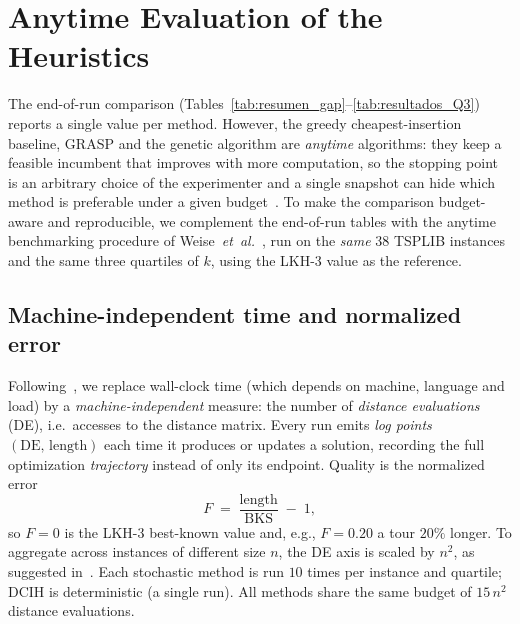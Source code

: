 
\section{Anytime Evaluation of the Heuristics}\label{sec:anytime}

The end-of-run comparison (Tables~\ref{tab:resumen_gap}--\ref{tab:resultados_Q3})
reports a single value per method. However, the greedy cheapest-insertion
baseline, GRASP and the genetic algorithm are \emph{anytime} algorithms: they
keep a feasible incumbent that improves with more computation, so the stopping
point is an arbitrary choice of the experimenter and a single snapshot can hide
which method is preferable under a given budget~\cite{weise2014benchmarking}. To
make the comparison budget-aware and reproducible, we complement the end-of-run
tables with the anytime benchmarking procedure of
Weise~\textit{et~al.}~\cite{weise2014benchmarking}, run on the \emph{same} 38
TSPLIB instances and the same three quartiles of $k$, using the LKH-3 value as the
reference.

\subsection{Machine-independent time and normalized error}
Following~\cite{weise2014benchmarking}, we replace wall-clock time (which depends
on machine, language and load) by a \emph{machine-independent} measure: the number
of \emph{distance evaluations} (DE), i.e.\ accesses to the distance matrix. Every
run emits \emph{log points} $(\mathrm{DE},\,\text{length})$ each time it produces
or updates a solution, recording the full optimization \emph{trajectory} instead
of only its endpoint. Quality is the normalized error
\begin{equation}
F \;=\; \frac{\text{length}}{\text{BKS}} \;-\; 1 ,
\end{equation}
so $F=0$ is the LKH-3 best-known value and, e.g., $F=0.20$ a tour $20\%$ longer.
To aggregate across instances of different size $n$, the DE axis is scaled by
$n^2$, as suggested in~\cite{weise2014benchmarking}. Each stochastic method is run
$10$ times per instance and quartile; DCIH is deterministic (a single run). All
methods share the same budget of $15\,n^2$ distance evaluations.

